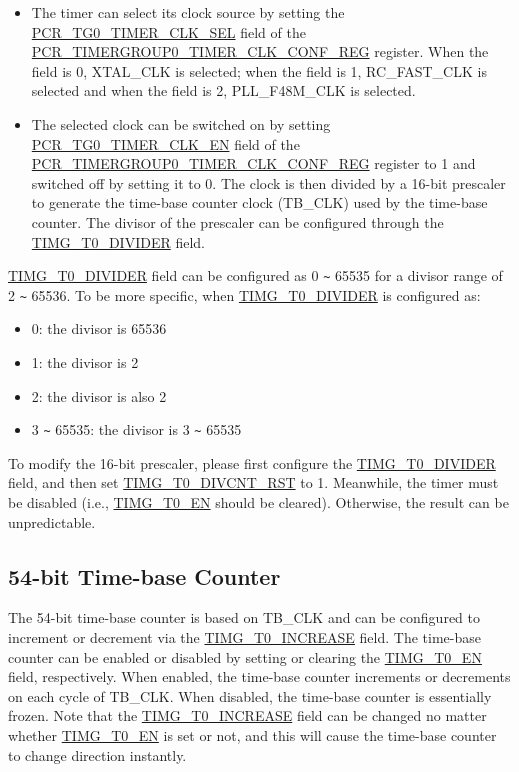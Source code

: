 \documentclass[main\_\_EN.tex]{subfiles}
\begin{document}
\begin{itemize}
    \item The timer can select its clock source by setting the \hyperref[fielddesc:PCRTG0TIMERCLKSEL]{PCR\_TG0\_TIMER\_CLK\_SEL} field of the \hyperref[regdesc:PCRTIMERGROUP0TIMERCLKCONFREG]{PCR\_TIMERGROUP0\_TIMER\_CLK\_CONF\_REG} register. When the field is 0, XTAL\_CLK is selected; when the field is 1, RC\_FAST\_CLK is selected and when the field is 2, PLL\_F48M\_CLK is selected.

    \item The selected clock can be switched on by setting \hyperref[fielddesc:PCRTG0TIMERCLKEN]{PCR\_TG0\_TIMER\_CLK\_EN} field of the \hyperref[regdesc:PCRTIMERGROUP0TIMERCLKCONFREG]{PCR\_TIMERGROUP0\_TIMER\_CLK\_CONF\_REG} register to 1 and switched off by setting it to 0. The clock is then divided by a 16-bit prescaler to generate the time-base counter clock (TB\_CLK) used by the time-base counter. The divisor of the prescaler can be configured through the \hyperref[fielddesc:TIMGTXDIVIDER]{TIMG\_T0\_DIVIDER} field.
\end{itemize}

\hyperref[fielddesc:TIMGTXDIVIDER]{TIMG\_T0\_DIVIDER} field can be configured as 0 \verb+~+ 65535 for a divisor range of 2 \verb+~+ 65536. To be more specific, when \hyperref[fielddesc:TIMGTXDIVIDER]{TIMG\_T0\_DIVIDER} is configured as:
\begin{itemize}
    \item 0: the divisor is 65536
    \item 1: the divisor is 2
    \item 2: the divisor is also 2
    \item 3 \verb+~+ 65535: the divisor is 3 \verb+~+ 65535
\end{itemize}

To modify the 16-bit prescaler, please first configure the \hyperref[fielddesc:TIMGTXDIVIDER]{TIMG\_T0\_DIVIDER} field, and then set \hyperref[{fielddesc:TIMGTXDIVCNTRST}]{TIMG\_T0\_DIVCNT\_RST} to 1. Meanwhile, the timer must be disabled (i.e., \hyperref[fielddesc:TIMGTXEN]{TIMG\_T0\_EN} should be cleared). Otherwise, the result can be unpredictable.

\subsection{54-bit Time-base Counter}

The 54-bit time-base counter is based on TB\_CLK and can be configured to increment or decrement via the \hyperref[fielddesc:TIMGTXINCREASE]{TIMG\_T0\_INCREASE} field. The time-base counter can be enabled or disabled by setting or clearing the \hyperref[fielddesc:TIMGTXEN]{TIMG\_T0\_EN} field, respectively. When enabled, the time-base counter increments or decrements on each cycle of TB\_CLK. When disabled, the time-base counter is essentially frozen. Note that the \hyperref[fielddesc:TIMGTXINCREASE]{TIMG\_T0\_INCREASE} field can be changed no matter whether \hyperref[fielddesc:TIMGTXEN]{TIMG\_T0\_EN} is set or not, and this will cause the time-base counter to change direction instantly.
\end{document}
